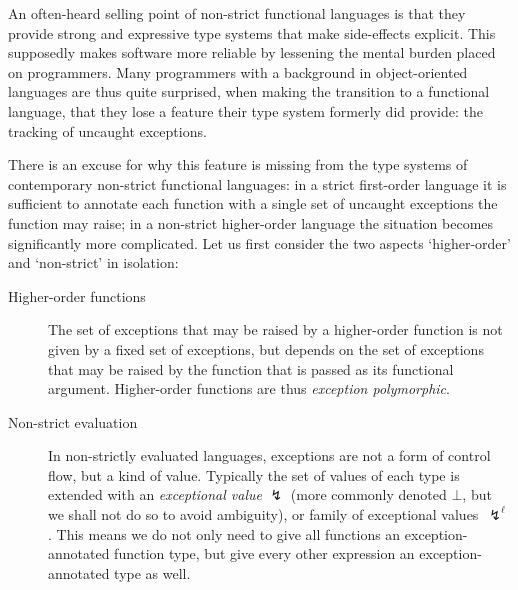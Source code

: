 \documentclass{llncs}
\begin{document}
An often-heard selling point of non-strict functional languages is that they provide strong and expressive type systems that make side-effects explicit. This supposedly makes software more reliable by lessening the mental burden placed on programmers. Many programmers with a background in object-oriented languages are thus quite surprised, when making the transition to a functional language, that they lose a feature their type system formerly did provide: the tracking of uncaught exceptions.

There is an excuse for why this feature is missing from the type systems of contemporary non-strict functional languages: in a strict first-order language it is sufficient to annotate each function with a single set of uncaught exceptions the function may raise; in a non-strict higher-order language the situation becomes significantly more complicated. Let us first consider the two aspects `higher-order' and `non-strict' in isolation:

\begin{description}

    \item [Higher-order functions] The set of exceptions that may be raised by a higher-order function is not given by a fixed set of exceptions, but depends on the set of exceptions that may be raised by the function that is passed as its functional argument. Higher-order functions are thus \emph{exception polymorphic}.

    \item [Non-strict evaluation] In non-strictly evaluated languages, exceptions are not a form of control flow, but a kind of value. Typically the set of values of each type is extended with an \emph{exceptional value} $\lightning$ (more commonly denoted $\bot$, but we shall not do so to avoid ambiguity), or family of exceptional values~$\lightning^\ell$. This means we do not only need to give all functions an exception-annotated function type, but give every other expression an exception-annotated type as well.

\end{description}
\end{document}
